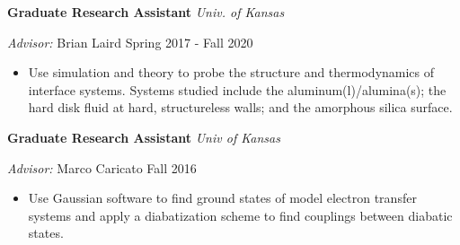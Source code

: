 {\bf Graduate Research Assistant} \hfill \textit{Univ. of Kansas}

\textit{Advisor: } Brian Laird \hfill Spring 2017 - Fall 2020

\begin{itemize}[rightmargin=\dimexpr\linewidth-10cm-\leftmargin\relax,noitemsep,topsep=0cm]
  \raggedright
  \item Use simulation and theory to probe the structure and thermodynamics
  of interface systems. Systems studied include the aluminum(l)/alumina(s);
  the hard disk fluid at hard, structureless walls; and the amorphous silica surface.
\end{itemize}

\vspace{\y}
{\bf Graduate Research Assistant} \hfill \textit{Univ of Kansas}

\textit{Advisor: } Marco Caricato \hfill Fall 2016

\begin{itemize}[rightmargin=\dimexpr\linewidth-10cm-\leftmargin\relax,noitemsep,topsep=0cm]
  \raggedright
  \item Use Gaussian software to find ground states of model electron transfer systems and apply a diabatization scheme to find couplings between diabatic states.
\end{itemize}
